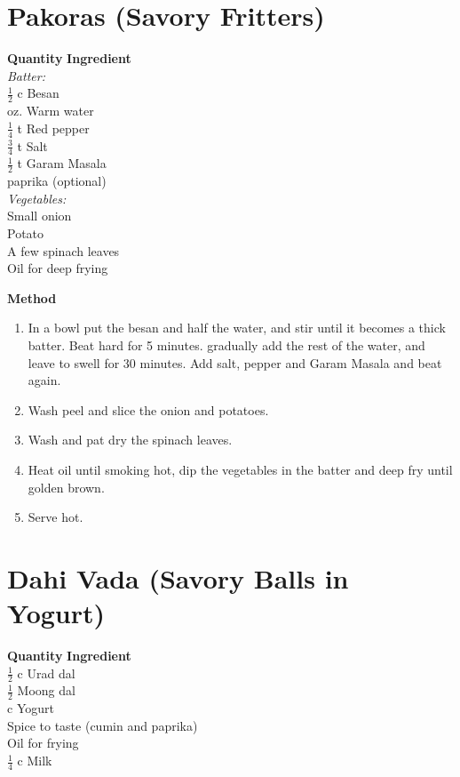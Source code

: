 \section{Pakoras (Savory Fritters)}

\begin{tabbing}

\hspace{1.0cm}  \={\bf Quantity}   \hspace{3.0cm} \={\bf Ingredient}\\
{\em Batter:}\\

\>  $\frac{1}{2}$ c\> Besan\\
 oz. \>Warm water\\
\> $\frac{1}{4}$ t \>Red pepper\\
\> $\frac{3}{4}$ t \>Salt\\
\> $\frac{1}{2}$ t \>Garam Masala\\
\> \>paprika (optional)\\

{\em Vegetables:}\\

 \>Small onion\\
 \>Potato\\
\>\> A few spinach leaves \\
\>\> Oil for deep frying\\
\end{tabbing}

{\bf Method}
\begin{enumerate}
\item  In a bowl put the besan and half the water, and stir until it becomes
a thick batter.  Beat hard for 5 minutes. gradually add the rest of the water,
and leave to swell for 30 minutes.  Add salt, pepper and Garam Masala and
beat again.
\item Wash peel and slice the onion and potatoes.
\item Wash and pat dry the spinach leaves.
\item Heat oil until smoking hot, dip the vegetables in the batter and deep
fry until golden brown.
\item Serve hot.
\end{enumerate}


\section{Dahi Vada (Savory Balls in Yogurt)}

\begin{tabbing}
\hspace{1.0cm}  \={\bf Quantity}   \hspace{3.0cm} \={\bf Ingredient}\\
\>  $\frac{1}{2}$ c \>Urad dal\\
\>  $\frac{1}{2}$ \>Moong dal\\
 c \>Yogurt\\     
\>\>  Spice to taste (cumin and paprika)\\
\>\>  Oil for frying\\
\>  $\frac{1}{4}$ c\> Milk\\
\end{tabbing}

